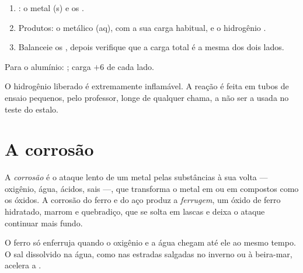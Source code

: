 \begin{method}\label{met:g9:metals-acids-corrosion:write}
\begin{enumerate}
  \item {}: o metal (s) e os  .
  \item Produtos: o  metálico (aq), com a sua carga habitual, e o
        hidrogênio .
  \item Balanceie os , depois verifique que a carga total é a mesma
        dos dois lados.
\end{enumerate}
Para o alumínio: ; carga
$+6$ de cada lado.
\end{method}

\begin{safety}{}
O hidrogênio liberado é extremamente inflamável. A reação é feita em
tubos de ensaio pequenos, pelo professor, longe de qualquer chama, a não
ser a usada no teste do estalo.
\end{safety}

\section{A corrosão}

\begin{definition}\label{def:g9:metals-acids-corrosion:corrosion}
A \emph{corrosão} é o ataque lento de um metal pelas
substâncias à sua volta --- oxigênio, água, ácidos, sais ---, que
transforma o metal em  ou em compostos como os óxidos. A corrosão do
ferro e do aço produz a \emph{ferrugem}, um óxido de
ferro hidratado, marrom e quebradiço, que se solta em lascas e deixa o
ataque continuar mais fundo.
\end{definition}

\begin{proposition}\label{prop:g9:metals-acids-corrosion:needs}
O ferro só enferruja quando o oxigênio e a água chegam até ele ao mesmo
tempo. O sal dissolvido na água, como nas estradas salgadas no inverno
ou à beira-mar, acelera a .
\end{proposition}

